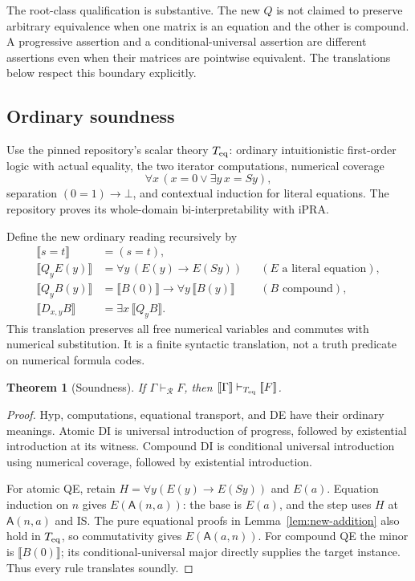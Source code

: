 \documentclass[11pt,a4paper]{article}
\newtheorem{theorem}{Theorem}[section]
\theoremstyle{definition}
\begin{document}
The root-class qualification is substantive.  The new $Q$ is not claimed to
preserve arbitrary equivalence when one matrix is an equation and the other
is compound.  A progressive assertion and a conditional-universal assertion
are different assertions even when their matrices are pointwise equivalent.
The translations below respect this boundary explicitly.

\subsection{Ordinary soundness}
\label{subsec:new-soundness}

Use the pinned repository's scalar theory $T_{\rm eq}$: ordinary
intuitionistic first-order logic with actual equality, the two iterator
computations, numerical coverage
\[
 \forall x\,(x=0\lor\exists y\,x=Sy),
\]
separation $(0=1)\to\bot$, and contextual induction for literal equations.
The repository proves its whole-domain bi-interpretability with iPRA.\cite{bridge}

Define the new ordinary reading recursively by
\begin{equation}
 \begin{aligned}
 \llbracket s=t\rrbracket&=(s=t),\\
 \llbracket Q_yE(y)\rrbracket
   &=\forall y\,(E(y)\to E(Sy))
       &&(E\text{ a literal equation}),\\
 \llbracket Q_yB(y)\rrbracket
   &=\llbracket B(0)\rrbracket\to
                  \forall y\,\llbracket B(y)\rrbracket
       &&(B\text{ compound}),\\
 \llbracket D_{x,y}B\rrbracket
   &=\exists x\,\llbracket Q_yB\rrbracket.
 \end{aligned}
 \label{eq:new-reading}
\end{equation}
This translation preserves all free numerical variables and commutes with
numerical substitution.  It is a finite syntactic translation, not a truth
predicate on numerical formula codes.

\begin{theorem}[Soundness]
\label{thm:new-soundness}
If $\Gamma\vdash_{\mathcal R}F$, then
$\llbracket\Gamma\rrbracket\vdash_{T_{\rm eq}}\llbracket F\rrbracket$.
\end{theorem}
\begin{proof}
Hyp, computations, equational transport, and DE have their ordinary meanings.
Atomic DI is universal introduction of progress, followed by existential
introduction at its witness.  Compound DI is conditional universal
introduction using numerical coverage, followed by existential introduction.

For atomic QE, retain
$H=\forall y(E(y)\to E(Sy))$ and $E(a)$.
Equation induction on $n$ gives $E(\mathsf A(n,a))$: the base is $E(a)$,
and the step uses $H$ at $\mathsf A(n,a)$ and IS.  The pure equational
proofs in Lemma~\ref{lem:new-addition} also hold in $T_{\rm eq}$, so
commutativity gives $E(\mathsf A(a,n))$.  For compound QE the minor is
$\llbracket B(0)\rrbracket$; its conditional-universal major directly
supplies the target instance.  Thus every rule translates soundly.
\end{proof}
\end{document}
